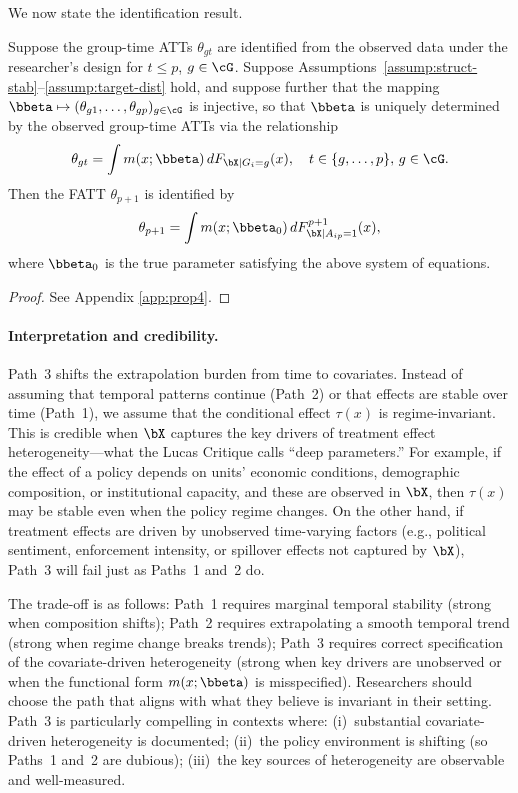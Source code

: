 \documentclass{article}
\begin{document}
We now state the identification result.

\begin{proposition}\label{prop:path3}
Suppose the group-time ATTs $\theta_{gt}$ are identified from the observed data under the researcher's design for $t \leq p$, $g \in \cG$. Suppose Assumptions~\ref{assump:struct-stab}--\ref{assump:target-dist} hold, and suppose further that the mapping $\bbeta \mapsto (\theta_{g1}, \ldots, \theta_{gp})_{g \in \cG}$ is injective, so that $\bbeta$ is uniquely determined by the observed group-time ATTs via the relationship
\begin{align*}
    \theta_{gt} = \int m(x; \bbeta) \, dF_{\bX | G_i=g}(x), \quad t \in \{g,\ldots,p\}, \, g \in \cG.
\end{align*}
Then the FATT $\theta_{p+1}$ is identified by
\begin{align*}
    \theta_{p+1} = \int m(x; \bbeta_0) \, dF_{\bX | A_{ip}=1}^{p+1}(x),
\end{align*}
where $\bbeta_0$ is the true parameter satisfying the above system of equations.
\end{proposition}

\begin{proof}
See Appendix \ref{app:prop4}.
\end{proof}

\paragraph{Interpretation and credibility.} Path~3 shifts the extrapolation burden from time to covariates. Instead of assuming that temporal patterns continue (Path~2) or that effects are stable over time (Path~1), we assume that the conditional effect $\tau(x)$ is regime-invariant. This is credible when $\bX$ captures the key drivers of treatment effect heterogeneity---what the Lucas Critique calls ``deep parameters.'' For example, if the effect of a policy depends on units' economic conditions, demographic composition, or institutional capacity, and these are observed in $\bX$, then $\tau(x)$ may be stable even when the policy regime changes. On the other hand, if treatment effects are driven by unobserved time-varying factors (e.g., political sentiment, enforcement intensity, or spillover effects not captured by $\bX$), Path~3 will fail just as Paths~1 and~2 do.

The trade-off is as follows: Path~1 requires marginal temporal stability (strong when composition shifts); Path~2 requires extrapolating a smooth temporal trend (strong when regime change breaks trends); Path~3 requires correct specification of the covariate-driven heterogeneity (strong when key drivers are unobserved or when the functional form $m(x;\bbeta)$ is misspecified). Researchers should choose the path that aligns with what they believe is invariant in their setting. Path~3 is particularly compelling in contexts where: (i)~substantial covariate-driven heterogeneity is documented; (ii)~the policy environment is shifting (so Paths~1 and~2 are dubious); (iii)~the key sources of heterogeneity are observable and well-measured.
\end{document}

